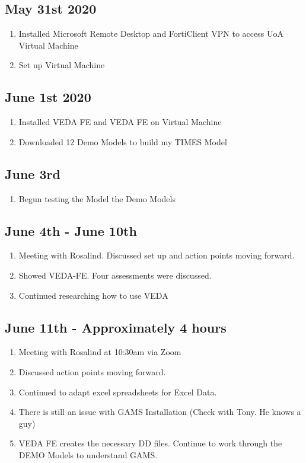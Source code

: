 \documentclass[12pt]{article}
\begin{document}
\subsection{May 31st 2020}
\begin{enumerate}
	\item Installed Microsoft Remote Desktop and FortiClient VPN to access UoA Virtual Machine
	\item Set up Virtual Machine
\end{enumerate}
\subsection{June 1st 2020}
\begin{enumerate}
	\item Installed VEDA FE and VEDA FE on Virtual Machine
	\item Downloaded 12 Demo Models to build my TIMES Model
\end{enumerate}
\subsection{June 3rd}
\begin{enumerate}
	\item Begun testing the Model the Demo Models
\end{enumerate}
\subsection{June 4th - June 10th}
\begin{enumerate}
	\item Meeting with Rosalind. Discussed set up and action points moving forward.
	\item Showed VEDA-FE. Four assessments were discussed.
	\item Continued researching how to use VEDA
\end{enumerate}
\subsection{June 11th - Approximately 4 hours}
\begin{enumerate}
	\item Meeting with Rosalind at 10:30am via Zoom
	\item Discussed action points moving forward.
	\item Continued to adapt excel spreadsheets for Excel Data.
	\item There is still an issue with GAMS Installation (Check with Tony. He knows a guy)
	\item VEDA FE creates the necessary DD files. Continue to work through the DEMO Models to understand GAMS.
\end{enumerate}
\end{document}
